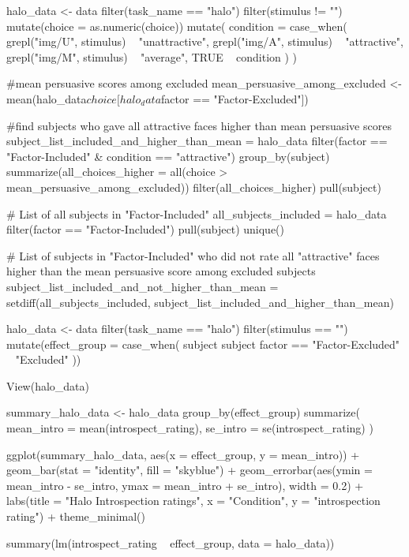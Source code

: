 \documentclass{article}
\begin{document}
halo_data <- data %
  filter(task_name == "halo") %
  filter(stimulus != "") %
  mutate(choice = as.numeric(choice)) %
  mutate(
    condition = case_when(
      grepl("img/U", stimulus) ~ "unattractive",
      grepl("img/A", stimulus) ~ "attractive",
      grepl("img/M", stimulus) ~ "average",
      TRUE ~ condition
    )
  )


#mean persuasive scores among excluded
mean_persuasive_among_excluded <- mean(halo_data$choice[halo_data$factor == "Factor-Excluded"])

#find subjects who gave all attractive faces higher than mean persuasive scores
subject_list_included_and_higher_than_mean = halo_data %
  filter(factor == "Factor-Included" & condition == "attractive") %
  group_by(subject) %
  summarize(all_choices_higher = all(choice > mean_persuasive_among_excluded)) %
  filter(all_choices_higher) %
  pull(subject)

# List of all subjects in "Factor-Included"
all_subjects_included = halo_data %
  filter(factor == "Factor-Included") %
  pull(subject) %
  unique()

# List of subjects in "Factor-Included" who did not rate all "attractive" faces higher than the mean persuasive score among excluded subjects
subject_list_included_and_not_higher_than_mean = setdiff(all_subjects_included, subject_list_included_and_higher_than_mean)


halo_data <- data %
  filter(task_name == "halo") %
  filter(stimulus == "") %
  mutate(effect_group = case_when(
    subject %
    subject %
    factor == "Factor-Excluded" ~ "Excluded"
    )) 

View(halo_data)

summary_halo_data <- halo_data %
  group_by(effect_group) %
  summarize(
    mean_intro = mean(introspect_rating),
    se_intro = se(introspect_rating)
  )

ggplot(summary_halo_data, aes(x = effect_group, y = mean_intro)) +
  geom_bar(stat = "identity", fill = "skyblue") +
  geom_errorbar(aes(ymin = mean_intro - se_intro, ymax = mean_intro + se_intro), width = 0.2) +
  labs(title = "Halo Introspection ratings", x = "Condition", y = "introspection rating") +
  theme_minimal()


summary(lm(introspect_rating ~ effect_group, data = halo_data))
\end{document}
